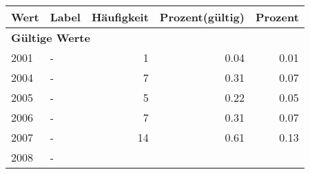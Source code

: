      \begin{longtable}{lXrrr}
     \toprule
     \textbf{Wert} & \textbf{Label} & \textbf{Häufigkeit} & \textbf{Prozent(gültig)} & \textbf{Prozent} \\
     \endhead
     \midrule
     \multicolumn{5}{l}{\textbf{Gültige Werte}}\\

     2001 &
     \multicolumn{1}{X}{ -  } &


       \num{1} &
       \num[round-mode=places,round-precision=2]{0,04} &
         \num[round-mode=places,round-precision=2]{0,01} \\

     2004 &
     \multicolumn{1}{X}{ -  } &


       \num{7} &
       \num[round-mode=places,round-precision=2]{0,31} &
         \num[round-mode=places,round-precision=2]{0,07} \\

     2005 &
     \multicolumn{1}{X}{ -  } &


       \num{5} &
       \num[round-mode=places,round-precision=2]{0,22} &
         \num[round-mode=places,round-precision=2]{0,05} \\

     2006 &
     \multicolumn{1}{X}{ -  } &


       \num{7} &
       \num[round-mode=places,round-precision=2]{0,31} &
         \num[round-mode=places,round-precision=2]{0,07} \\

     2007 &
     \multicolumn{1}{X}{ -  } &


       \num{14} &
       \num[round-mode=places,round-precision=2]{0,61} &
         \num[round-mode=places,round-precision=2]{0,13} \\

     2008 &
     \multicolumn{1}{X}{ -  } &



\end{longtable}
